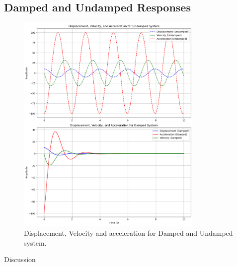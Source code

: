 \documentclass[12pt,a4paper]{article}
\begin{document}
\subsection{Damped and Undamped Responses}
\begin{figure}[H]
    \centering
    \includegraphics[width=0.8\textwidth]{disp_vel_acc_damp_and_undamp.png} 
    \caption{Displacement, Velocity and acceleration for Damped and Undamped system.}
    \label{fig:system}
\end{figure}
{\vspace{10pt}}
Discussion
{\vspace{10pt}}
\end{document}
